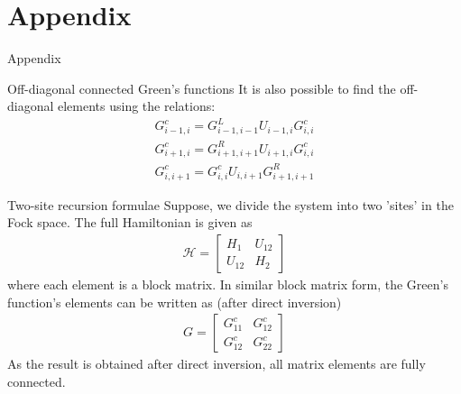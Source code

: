 \documentclass[usenames,dvipsnames]{beamer}
\newcommand{\ham}{\hat{\mathcal{H}}}
\begin{document}
\section*{Appendix}
\begin{frame}
	\centering
	{\Huge Appendix}
\end{frame}
\begin{frame}{Off-diagonal connected Green's functions}
	It is also possible to find the off-diagonal elements using the relations:
	\begin{align}\label{eqn:connecting-eqn-onebody}
	G^{c}_{i-1,i} = G^{L}_{i-1,i-1} U_{i-1,i} G^{c}_{i,i}\\
	G^{c}_{i+1,i} = G^{R}_{i+1,i+1} U_{i+1,i} G^{c}_{i,i}\\
	G^{c}_{i,i+1} = G^{c}_{i,i} U_{i,i+1} G^{R}_{i+1,i+1}
	\end{align}
\end{frame}
\begin{frame}{Two-site recursion formulae}
	Suppose, we divide the system into two 'sites' in the Fock space. The full Hamiltonian is given as
	\begin{align}
	\ham =
	\begin{bmatrix}
	H_1 	& 	U_{12} \\
	U_{12} 	& 	H_2
	\end{bmatrix}
	\end{align}
	where each element is a block matrix. In similar block matrix form, the Green's function's elements can be written as (after direct inversion)
	\begin{align}
	G =
	\begin{bmatrix}
	{G}^{c}_{11} 	& 	{G}^{c}_{12} \\
	{G}^{c}_{12} 	& 	{G}^{c}_{22}
	\end{bmatrix}
	\end{align}
	As the result is obtained after direct inversion, all matrix elements are fully connected.
\end{frame}
\end{document}
